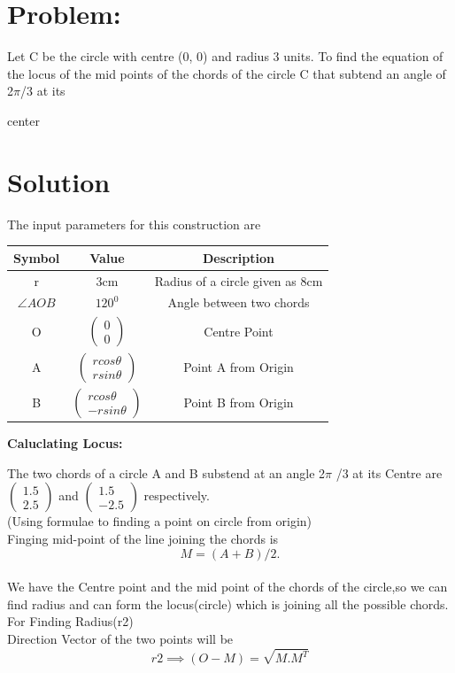 \documentclass[10pt,a4paper]{report}
\newcommand{\myvec}[1]{\ensuremath{\begin{pmatrix}#1\end{pmatrix}}}
\begin{document}
\begin{multicols}{2}
\section{Problem:}  Let C be the circle with centre (0, 0) and radius 3 units. To find the equation of the locus of the mid points of the chords of the circle C that subtend an angle of 2$\pi$/3 at its \raggedright center\vspace{3mm}
\section{Solution}
The input parameters for this construction are
\begin{center}
\begin{tabular}{|c|c|c|}
  \hline
  \textbf{Symbol}&\textbf{Value}&\textbf{Description}\\
  \hline
  r & 3cm & Radius of a circle given as 8cm\\
  \hline
  $\angle{AOB}$ & $120^0$ & Angle between two chords\\
  \hline 
  O & $\myvec{0\\0}$ & Centre Point\\
  \hline
  A & $\myvec{rcos \theta \\ rsin \theta }$ &  Point A from Origin\\
  \hline
  B & $\myvec{ rcos\theta \\ -rsin\theta}$ & Point B from Origin\\
  \hline
\end{tabular}
\end{center}
\raggedright\textbf{Caluclating Locus:} \\
\raggedright The two chords of a circle A and B substend at an angle 2$\pi$ /3 at its Centre are $\myvec{1.5 \\ 2.5}$ and $\myvec{ 1.5 \\ -2.5}$ respectively.\\(Using formulae to finding a point on circle from origin)\\
  \centering Finging mid-point of the line joining the chords is \\ 
   \centering    \begin{equation} M=(A+B)/2. \end{equation} \\
  We have the Centre point and the mid point of the chords of the circle,so we can find radius and can form the locus(circle) which is joining all the possible chords.
 \\ For Finding Radius(r2) \\ Direction Vector of the two  points will be \\     \begin{equation} 
  r2 \implies (O-M)=\sqrt{M.M^T} 
 \end{equation}\\ 
 

\end{multicols}
\end{document}
